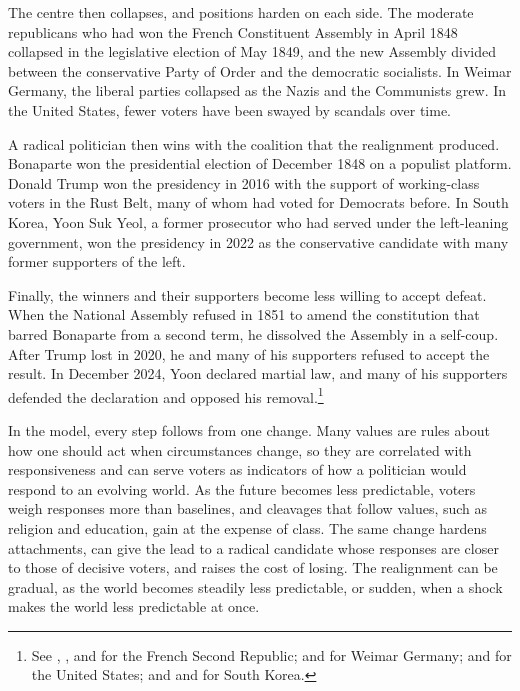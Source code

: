 \documentclass[12pt,letterpaper]{article}
\begin{document}
The centre then collapses, and positions harden on each side. The moderate republicans who had won the French Constituent Assembly in April 1848 collapsed in the legislative election of May 1849, and the new Assembly divided between the conservative Party of Order and the democratic socialists. In Weimar Germany, the liberal parties collapsed as the Nazis and the Communists grew. In the United States, fewer voters have been swayed by scandals over time.

A radical politician then wins with the coalition that the realignment produced. Bonaparte won the presidential election of December 1848 on a populist platform. Donald Trump won the presidency in 2016 with the support of working-class voters in the Rust Belt, many of whom had voted for Democrats before. In South Korea, Yoon Suk Yeol, a former prosecutor who had served under the left-leaning government, won the presidency in 2022 as the conservative candidate with many former supporters of the left.

Finally, the winners and their supporters become less willing to accept defeat. When the National Assembly refused in 1851 to amend the constitution that barred Bonaparte from a second term, he dissolved the Assembly in a self-coup. After Trump lost in 2020, he and many of his supporters refused to accept the result. In December 2024, Yoon declared martial law, and many of his supporters defended the declaration and opposed his removal.\footnote{See \citet{Price2004}, \citet{NohlenStover2010}, and \citet{Tocqueville2016} for the French Second Republic; \citet{King2008} and \citet{Evans2003} for Weimar Germany; \citet{Skelley2017} and \citet{Rottinghaus2025} for the United States; and \citet{Jang2025} and \citet{Jeong2025} for South Korea.}

In the model, every step follows from one change. Many values are rules about how one should act when circumstances change, so they are correlated with responsiveness and can serve voters as indicators of how a politician would respond to an evolving world. As the future becomes less predictable, voters weigh responses more than baselines, and cleavages that follow values, such as religion and education, gain at the expense of class. The same change hardens attachments, can give the lead to a radical candidate whose responses are closer to those of decisive voters, and raises the cost of losing. The realignment can be gradual, as the world becomes steadily less predictable, or sudden, when a shock makes the world less predictable at once.
\end{document}
